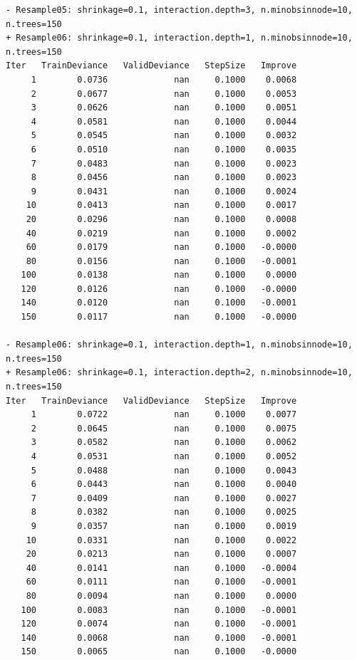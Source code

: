 \documentclass[
  letterpaper,
  DIV=11,
  numbers=noendperiod]{scrartcl}
\begin{document}
\begin{verbatim}
- Resample05: shrinkage=0.1, interaction.depth=3, n.minobsinnode=10, n.trees=150 
+ Resample06: shrinkage=0.1, interaction.depth=1, n.minobsinnode=10, n.trees=150 
Iter   TrainDeviance   ValidDeviance   StepSize   Improve
     1        0.0736             nan     0.1000    0.0068
     2        0.0677             nan     0.1000    0.0053
     3        0.0626             nan     0.1000    0.0051
     4        0.0581             nan     0.1000    0.0044
     5        0.0545             nan     0.1000    0.0032
     6        0.0510             nan     0.1000    0.0035
     7        0.0483             nan     0.1000    0.0023
     8        0.0456             nan     0.1000    0.0023
     9        0.0431             nan     0.1000    0.0024
    10        0.0413             nan     0.1000    0.0017
    20        0.0296             nan     0.1000    0.0008
    40        0.0219             nan     0.1000    0.0002
    60        0.0179             nan     0.1000   -0.0000
    80        0.0156             nan     0.1000   -0.0001
   100        0.0138             nan     0.1000    0.0000
   120        0.0126             nan     0.1000   -0.0000
   140        0.0120             nan     0.1000   -0.0001
   150        0.0117             nan     0.1000   -0.0000

- Resample06: shrinkage=0.1, interaction.depth=1, n.minobsinnode=10, n.trees=150 
+ Resample06: shrinkage=0.1, interaction.depth=2, n.minobsinnode=10, n.trees=150 
Iter   TrainDeviance   ValidDeviance   StepSize   Improve
     1        0.0722             nan     0.1000    0.0077
     2        0.0645             nan     0.1000    0.0075
     3        0.0582             nan     0.1000    0.0062
     4        0.0531             nan     0.1000    0.0052
     5        0.0488             nan     0.1000    0.0043
     6        0.0443             nan     0.1000    0.0040
     7        0.0409             nan     0.1000    0.0027
     8        0.0382             nan     0.1000    0.0025
     9        0.0357             nan     0.1000    0.0019
    10        0.0331             nan     0.1000    0.0022
    20        0.0213             nan     0.1000    0.0007
    40        0.0141             nan     0.1000   -0.0004
    60        0.0111             nan     0.1000   -0.0001
    80        0.0094             nan     0.1000    0.0000
   100        0.0083             nan     0.1000   -0.0001
   120        0.0074             nan     0.1000   -0.0001
   140        0.0068             nan     0.1000   -0.0001
   150        0.0065             nan     0.1000   -0.0000


\end{verbatim}
\end{document}
